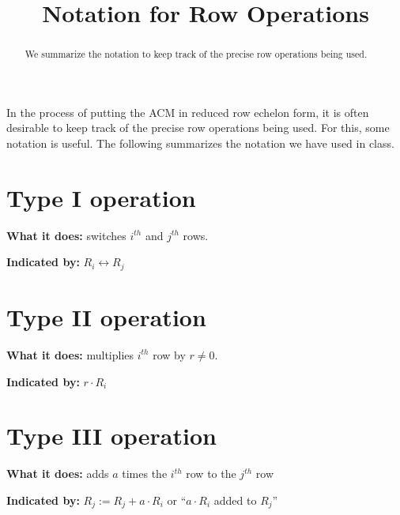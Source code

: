 \documentclass{ximera}
\title{Notation for Row Operations}
\begin{document}
\begin{abstract}
  We summarize the notation to keep track of the precise row operations being used.
\end{abstract}
\maketitle

In the process of putting the ACM in reduced row echelon form, it is
often desirable to keep track of the precise row operations being
used. For this, some notation is useful. The following summarizes the
notation we have used in class.

\section{Type I operation}

\textbf{What it does:} switches $i^{th}$ and $j^{th}$ rows.

\textbf{Indicated by:} $R_i\leftrightarrow R_j$

\section{Type II operation}

\textbf{What it does:} multiplies $i^{th}$ row by $r\ne 0$.

\textbf{Indicated by:}  $r\cdot R_i$

\section{Type III operation}

\textbf{What it does:} adds $a$ times the $i^{th}$ row to the $j^{th}$ row

\textbf{Indicated by:} $R_j := R_j + a\cdot R_i$ or ``$a\cdot R_i$ added to $R_j$''
\end{document}
